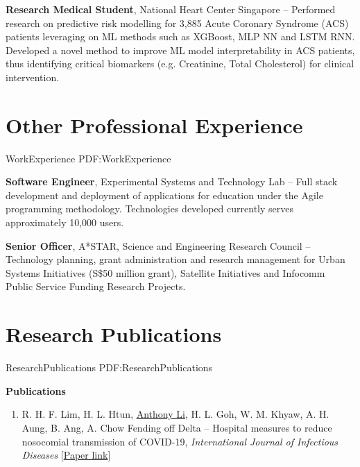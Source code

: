 \documentclass[letterpaper,10pt,oneside]{article}
\begin{document}
\begin{body}
\BigGap
{\textbf{Research Medical Student}, National Heart Center Singapore}
\hfill
{} --  
\BulletItem 
Performed research on predictive risk modelling for 3,885 Acute Coronary Syndrome (ACS) patients leveraging on ML methods such as XGBoost, MLP NN and LSTM RNN.
\BulletItem
Developed a novel method to improve ML model interpretability in ACS patients, thus identifying critical biomarkers (e.g. Creatinine, Total Cholesterol) for clinical intervention.

\section
{Other Professional Experience}
{WorkExperience}
{PDF:WorkExperience}

{\textbf{Software Engineer}, Experimental Systems and Technology Lab}
\hfill
{} --
\BulletItem
Full stack development and deployment of applications for education under the Agile programming methodology. Technologies developed currently serves approximately 10,000 users.

\BigGap
{\textbf{Senior Officer}, A*STAR, Science and Engineering Research Council}
\hfill
{} --
\BulletItem
Technology planning, grant administration and research management for Urban Systems Initiatives (S\$50 million grant), Satellite Initiatives and Infocomm Public Service Funding Research Projects.



\section
{Research Publications}
{ResearchPublications}
{PDF:ResearchPublications}

\textbf{Publications}
\GapNoBreak
{}

\begin{enumerate}
\item R. H. F. Lim, H. L. Htun, \underline{Anthony Li}, H. L. Goh, W. M. Khyaw, A. H. Aung, B. Ang, A. Chow \textcolor{mygray}{Fending off Delta – Hospital measures to reduce nosocomial transmission of COVID-19}, \textit{International Journal of Infectious Diseases }[\href{https://www.ijidonline.com/article/S1201-9712(22)00077-7/fulltext}{Paper link}]



\end{enumerate}
\end{body}
\end{document}
